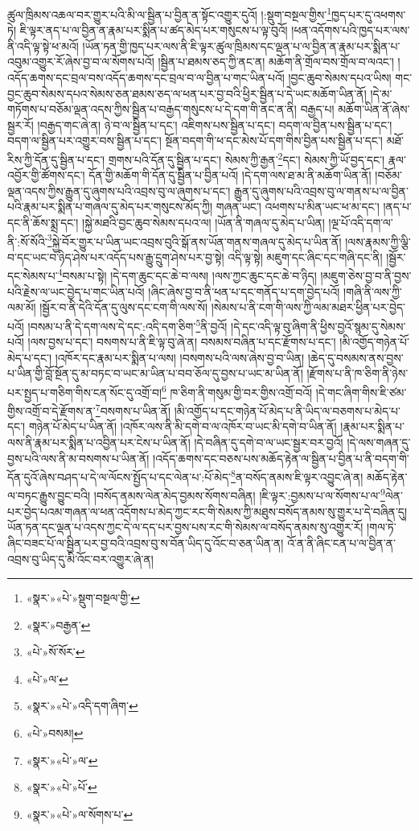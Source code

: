 ཚུལ་ཁྲིམས་འཆལ་བར་གྱུར་པའི་མི་ལ་སྦྱིན་པ་བྱིན་ན་སྟོང་འགྱུར་དུའོ། །:སྡུག་བསྔལ་གྱིས་\footnote{«སྣར་»«པེ་»སྡུག་བསྔལ་གྱི་}ཁྱད་པར་དུ་འཕགས་ཏེ། ཇི་ལྟར་ནད་པ་ལ་བྱིན་ན་རྣམ་པར་སྨིན་པ་ཚད་མེད་པར་གསུངས་པ་ལྟ་བུའོ། །ཕན་འདོགས་པའི་ཁྱད་པར་ལས་ནི་འདི་ལྟ་སྟེ་ཕ་མའོ། །ཡོན་ཏན་གྱི་ཁྱད་པར་ལས་ནི་ཇི་ལྟར་ཚུལ་ཁྲིམས་དང་ལྡན་པ་ལ་བྱིན་ན་རྣམ་པར་སྨིན་པ་འབུམ་འགྱུར་རོ་ཞེས་བྱ་བ་ལ་སོགས་པའོ། །སྦྱིན་པ་ཐམས་ཅད་ཀྱི་ནང་ན། མཆོག་ནི་གྲོལ་བས་གྲོལ་བ་ལའང་། །འདོད་ཆགས་དང་བྲལ་བས་འདོད་ཆགས་དང་བྲལ་བ་ལ་བྱིན་པ་གང་ཡིན་པའོ། །བྱང་ཆུབ་སེམས་དཔའ་ཡིས། གང་བྱང་ཆུབ་སེམས་དཔའ་སེམས་ཅན་ཐམས་ཅད་ལ་ཕན་པར་བྱ་བའི་ཕྱིར་སྦྱིན་པ་དེ་ཡང་མཆོག་ཡིན་ནོ། །དེ་མ་གཏོགས་པ་བཅོམ་ལྡན་འདས་ཀྱིས་སྦྱིན་པ་བརྒྱད་གསུངས་པ་དེ་དག་གི་ནང་ན་ནི། བརྒྱད་པ། མཆོག་ཡིན་ནོ་ཞེས་སྦྱར་རོ། །བརྒྱད་གང་ཞེ་ན། ཉེ་བ་ལ་སྦྱིན་པ་དང་། འཇིགས་པས་སྦྱིན་པ་དང་། བདག་ལ་བྱིན་པས་སྦྱིན་པ་དང་། བདག་ལ་སྦྱིན་པར་འགྱུར་བས་སྦྱིན་པ་དང་། སྔོན་བདག་གི་ཕ་དང་མེས་པོ་དག་གིས་བྱིན་པས་སྦྱིན་པ་དང་། མཐོ་རིས་ཀྱི་དོན་དུ་སྦྱིན་པ་དང་། གྲགས་པའི་དོན་དུ་སྦྱིན་པ་དང་། སེམས་ཀྱི་རྒྱན་\footnote{«སྣར་»བརྒྱན་}དང་། སེམས་ཀྱི་ཡོ་བྱད་དང་། རྣལ་འབྱོར་གྱི་ཚོགས་དང་། དོན་གྱི་མཆོག་གི་དོན་དུ་སྦྱིན་པ་བྱིན་པའོ། །དེ་དག་ལས་ཐ་མ་ནི་མཆོག་ཡིན་ནོ། །བཅོམ་ལྡན་འདས་ཀྱིས་རྒྱུན་དུ་ཞུགས་པའི་འབྲས་བུ་ལ་ཞུགས་པ་དང་། རྒྱུན་དུ་ཞུགས་པའི་འབྲས་བུ་ལ་གནས་པ་ལ་བྱིན་པའི་རྣམ་པར་སྨིན་པ་གཞལ་དུ་མེད་པར་གསུངས་མོད་ཀྱི། གཞན་ཡང་། འཕགས་པ་མིན་ཡང་ཕ་མ་དང་། །ནད་པ་དང་ནི་ཆོས་སྨྲ་དང་། །སྐྱེ་མཐའི་བྱང་ཆུབ་སེམས་དཔའ་ལ། །ཡོན་ནི་གཞལ་དུ་མེད་པ་ཡིན། །ལྔ་པོ་འདི་དག་ལ་ནི་:སོ་སོའི་\footnote{«པེ་»སོ་སོར་}སྐྱེ་བོར་གྱུར་པ་ཡིན་ཡང་འབྲས་བུའི་སྒོ་ནས་ཡོན་གནས་གཞལ་དུ་མེད་པ་ཡིན་ནོ། །ལས་རྣམས་ཀྱི་ལྕི་བ་དང་ཡང་བ་ཉིད་ཤེས་པར་འདོད་པས་རྒྱུ་དྲུག་ཤེས་པར་བྱ་སྟེ། འདི་ལྟ་སྟེ། མཇུག་དང་ཞིང་དང་གཞི་དང་ནི། །སྦྱོར་དང་སེམས་པ་\footnote{«པེ་»ལ་}བསམ་པ་སྟེ། །དེ་དག་ཆུང་དང་ཆེ་བ་ལས། །ལས་ཀྱང་ཆུང་དང་ཆེ་བ་ཉིད། །མཇུག་ཅེས་བྱ་བ་ནི་བྱས་པའི་རྗེས་ལ་ཡང་བྱེད་པ་གང་ཡིན་པའོ། །ཞིང་ཞེས་བྱ་བ་ནི་ཕན་པ་དང་གནོད་པ་དག་བྱེད་པའོ། །གཞི་ནི་ལས་ཀྱི་ལམ་མོ། །སྦྱོར་བ་ནི་དེའི་དོན་དུ་ལུས་དང་ངག་གི་ལས་སོ། །སེམས་པ་ནི་ངག་གི་ལས་ཀྱི་ལམ་མཐར་ཕྱིན་པར་བྱེད་པའོ། །བསམ་པ་ནི་དེ་དག་ལས་དེ་དང་:འདི་དག་ཅིག་\footnote{«སྣར་»«པེ་»འདི་དག་ཞིག་}ནི་བྱའོ། །དེ་དང་འདི་ལྟ་བུ་ཞིག་ནི་ཕྱིས་བྱའོ་སྙམ་དུ་སེམས་པའོ། །ལས་བྱས་པ་དང་། བསགས་པ་ནི་ཇི་ལྟ་བུ་ཞེ་ན། བསམས་བཞིན་པ་དང་རྫོགས་པ་དང་། །མི་འགྱོད་གཉེན་པོ་མེད་པ་དང་། །འཁོར་དང་རྣམ་པར་སྨིན་པ་ལས། །བསགས་པའི་ལས་ཞེས་བྱ་བ་ཡིན། །ཆེད་དུ་བསམས་ནས་བྱས་པ་ཡིན་གྱི་བློ་སྔོན་དུ་མ་བཏང་བ་ཡང་མ་ཡིན་པ་བབ་ཅོལ་དུ་བྱས་པ་ཡང་མ་ཡིན་ནོ། །རྫོགས་པ་ནི་ཁ་ཅིག་ནི་ཉེས་པར་སྤྱད་པ་གཅིག་གིས་ངན་སོང་དུ་འགྲོ་བ།\footnote{«པེ་»བསམ།} ཁ་ཅིག་ནི་གསུམ་གྱི་བར་གྱིས་འགྲོ་བའོ། །དེ་གང་ཞིག་གིས་ཇི་ཙམ་གྱིས་འགྲོ་བ་དེ་རྫོགས་ན་\footnote{«སྣར་»«པེ་»ལ་}བསགས་པ་ཡིན་ནོ། །མི་འགྱོད་པ་དང་གཉེན་པོ་མེད་པ་ནི་ཡིད་ལ་བཅགས་པ་མེད་པ་དང་། གཉེན་པོ་མེད་པ་ཡིན་ནོ། །འཁོར་ལས་ནི་མི་དགེ་བ་ལ་འཁོར་བ་ཡང་མི་དགེ་བ་ཡིན་ནོ། །རྣམ་པར་སྨིན་པ་ལས་ནི་རྣམ་པར་སྨིན་པ་འབྱིན་པར་ངེས་པ་ཡིན་ནོ། །དེ་བཞིན་དུ་དགེ་བ་ལ་ཡང་སྦྱར་བར་བྱའོ། །དེ་ལས་གཞན་དུ་བྱས་པའི་ལས་ནི་མ་བསགས་པ་ཡིན་ནོ། །འདོད་ཆགས་དང་བཅས་པས་མཆོད་རྟེན་ལ་སྦྱིན་པ་བྱིན་པ་ནི་བདག་གི་དོན་དུའོ་ཞེས་བཤད་པ་དེ་ལ་ལོངས་སྤྱོད་པ་དང་ལེན་པ་:པོ་མེད་\footnote{«སྣར་»«པེ་»པོ་}ན་བསོད་ནམས་ཇི་ལྟར་འབྱུང་ཞེ་ན། མཆོད་རྟེན་ལ་བཏང་རྒྱུས་བྱུང་བའི། །བསོད་ནམས་ལེན་མེད་བྱམས་སོགས་བཞིན། །ཇི་ལྟར་:བྱམས་པ་ལ་སོགས་པ་ལ་\footnote{«སྣར་»«པེ་»ལ་སོགས་པ་}ལེན་པར་བྱེད་པའམ་གཞན་ལ་ཕན་འདོགས་པ་མེད་ཀྱང་རང་གི་སེམས་ཀྱི་མཐུས་བསོད་ནམས་སུ་གྱུར་པ་དེ་བཞིན་དུ། ཡོན་ཏན་དང་ལྡན་པ་འདས་ཀྱང་དེ་ལ་དད་པར་བྱས་པས་རང་གི་སེམས་ལ་བསོད་ནམས་སུ་འགྱུར་རོ། །གལ་ཏེ་ཞིང་བཟང་པོ་ལ་སྦྱིན་པར་བྱ་བའི་འབྲས་བུ་ས་བོན་ཡིད་དུ་འོང་བ་ཅན་ཡིན་ན། འོ་ན་ནི་ཞིང་ངན་པ་ལ་བྱིན་ན་འབྲས་བུ་ཡིད་དུ་མི་འོང་བར་འགྱུར་ཞེ་ན། 